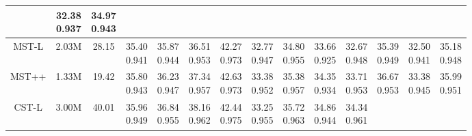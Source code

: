 \documentclass{article}
\begin{document}
\begin{table*}[t]
{\begin{tabular}{cccccccccccccc}
			&\tabincell{c}{32.38\\0.937}
			&\tabincell{c}{34.97\\0.943}
			\\
			\midrule
			MST-L \cite{mst}
			& 2.03M
			& 28.15
			&\tabincell{c}{35.40\\0.941}
			&\tabincell{c}{35.87\\0.944}
			&\tabincell{c}{36.51\\0.953}
			&\tabincell{c}{42.27\\0.973}
			&\tabincell{c}{32.77\\0.947}
			&\tabincell{c}{34.80\\0.955}
			&\tabincell{c}{33.66\\0.925}
			&\tabincell{c}{32.67\\0.948}
			&\tabincell{c}{35.39\\0.949}
			&\tabincell{c}{32.50\\0.941}
			&\tabincell{c}{35.18\\0.948}
			\\
			\midrule
			MST++ \cite{mst_pp}
			& 1.33M
			& 19.42
			&\tabincell{c}{35.80\\0.943}
			&\tabincell{c}{36.23\\0.947}
			&\tabincell{c}{37.34\\0.957}
			&\tabincell{c}{42.63\\0.973}
			&\tabincell{c}{33.38\\0.952}
			&\tabincell{c}{35.38\\0.957}
			&\tabincell{c}{34.35\\0.934}
			&\tabincell{c}{33.71\\0.953}
			&\tabincell{c}{36.67\\0.953}
			&\tabincell{c}{33.38\\0.945}
			&\tabincell{c}{35.99\\0.951}
			\\
			\midrule
			CST-L \cite{mst_pp}
			& 3.00M
			& 40.01
			&\tabincell{c}{35.96\\0.949}
			&\tabincell{c}{36.84\\0.955}
			&\tabincell{c}{38.16\\0.962}
			&\tabincell{c}{42.44\\0.975}
			&\tabincell{c}{33.25\\0.955}
			&\tabincell{c}{35.72\\0.963}
			&\tabincell{c}{34.86\\0.944}
			&\tabincell{c}{34.34\\0.961}

\end{tabular}}
\end{table*}
\end{document}
